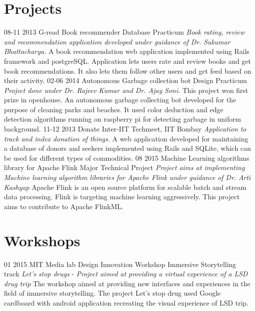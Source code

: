 \documentclass[]{friggeri-cv}
\begin{document}
\section{Projects}
\begin{entrylist}
  \projectentry
    {08-11 2013}
    {G-read Book recommender}
    {Database Practicum}
    {\emph{Book rating, review and recommendation application developed under guidance of Dr. Sukumar Bhattacharya.}}
    {A book recommendation web application implemented using Rails framework and postgreSQL. Application lets users rate and review books and get book recommendations. It also lets them follow other users and get feed based on their activity.}
  \projectentry
    {02-06 2014}
    {Autonomous Garbage collection bot}
    {Design Practicum}
    {\emph{Project done under Dr. Rajeev Kumar and Dr. Ajay Soni.}}
    {This project won first prize in openhouse. An autonomous garbage collecting bot developed for the purpose of cleaning parks and beaches. It used color deduction and edge detection algorithms running on raspberry pi for detecting garbage in uniform background.}
  \projectentry
    {11-12 2013}
    {Donate}
    {Inter-IIT Techmeet, IIT Bombay}
    {\emph{Application to track and index donation of things.}}
    {A web application developed for maintaining a database of donors and seekers implemented using Rails and SQLite, which can be used for different types of commodities.}
  \projectentry
  	{08 2015}
  	{Machine Learning algorithms library for Apache Flink}
  	{Major Technical Project}
  	{\emph{Project aims at implementing Machine learning algorithm libraries for Apache Flink under guidance of Dr. Arti Kashyap}}
  	{Apache Flink is an open source platform for scalable batch and stream data processing. Flink is targeting machine learning aggressively. This project aims to contribute to Apache FlinkML.}
\end{entrylist}

\section{Workshops}
\begin{entrylist}
  \projectentry
  	{01 2015}
  	{MIT Media lab Design Innovation Workshop}
  	{Immersive Storytelling track}
  	{\emph{Let's stop drugs} - \emph{Project aimed at providing a virtual experience of a LSD drug trip}}
  	{The workshop aimed at providing new interfaces and experiences in the field of immersive storytelling. The project Let's stop drug used Google cardboard with android application recreating the visual experience of LSD trip.}
\end{entrylist}
\end{document}

